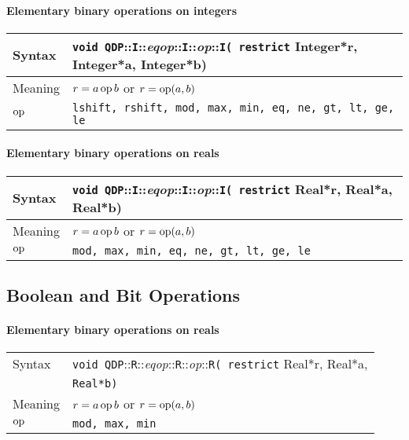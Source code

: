 \documentclass[12pt,letterpaper]{article}
\newcommand{\op}{\mathop{\rm op}}
\newcommand{\tReal}{Real}
\newcommand{\tInt}{Integer}
\newcommand{\namespace}{QDP}
\newcommand{\ttdash}{{::}}
\newcommand{\extraarg}{}
\begin{document}
\paragraph{Elementary binary operations on integers}

\begin{flushleft}
  \begin{tabular}{|l|l|}
  \hline
  Syntax      & {\tt void \namespace}\ttdash{\tt I}\ttdash{\it eqop}\ttdash{\tt I}\ttdash{\it op}\ttdash{\tt I( restrict}{ \tInt *r, \tInt *a, \tInt *b\extraarg)} \\
  \hline
  Meaning     & $r = a \op b$ or $r = \op(a,b)$\\
  \hline
  $\op$       & {\tt lshift, rshift, mod, max, min, eq, ne, gt, lt, ge, le} \\
  \hline
  \end{tabular}
\end{flushleft}

\paragraph{Elementary binary operations on reals}

\begin{flushleft}
  \begin{tabular}{|l|l|}
  \hline
  Syntax      & {\tt void \namespace}\ttdash{\tt I}\ttdash{\it eqop}\ttdash{\tt I}\ttdash{\it op}\ttdash{\tt I( restrict}{ \tReal *r, \tReal *a, \tReal *b\extraarg)} \\
  \hline
  Meaning     & $r = a \op b$ or $r = \op(a,b)$\\
  \hline
  $\op$       & {\tt mod, max, min, eq, ne, gt, lt, ge, le} \\
  \hline
  \end{tabular}
\end{flushleft}

\subsection{Boolean and Bit Operations}
\paragraph{Elementary binary operations on reals}

\begin{flushleft}
  \begin{tabular}{|l|l|}
  \hline
  Syntax      & {\tt void \namespace}\ttdash{\tt R}\ttdash{\it eqop}\ttdash{\tt R}\ttdash{\it op}\ttdash{\tt R( restrict}{ \tReal *r, \tReal *a,}\\
              & {\tt \tReal *b\extraarg)} \\
  \hline
  Meaning     & $r = a \op b$ or $r = \op(a,b)$ \\
  \hline
  $\op$       & {\tt mod, max, min} \\
  \hline
  \end{tabular}
\end{flushleft}
\end{document}
